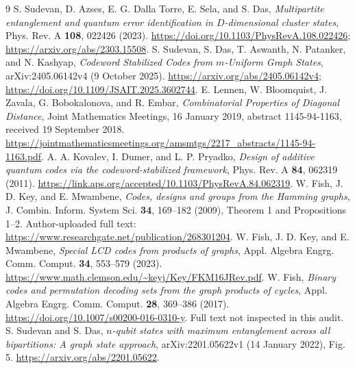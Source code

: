 \documentclass[10pt]{article}
\begin{document}
\begin{thebibliography}{9}
 S. Sudevan, D. Azses, E. G. Dalla Torre, E. Sela, and S. Das, \emph{Multipartite entanglement and quantum error identification in $D$-dimensional cluster states}, Phys. Rev. A \textbf{108}, 022426 (2023). \url{https://doi.org/10.1103/PhysRevA.108.022426}; \url{https://arxiv.org/abs/2303.15508}.
 S. Sudevan, S. Das, T. Aswanth, N. Patanker, and N. Kashyap, \emph{Codeword Stabilized Codes from $m$-Uniform Graph States}, arXiv:2405.06142v4 (9 October 2025). \url{https://arxiv.org/abs/2405.06142v4}; \url{https://doi.org/10.1109/JSAIT.2025.3602744}.
 E. Lennen, W. Bloomquist, J. Zavala, G. Bobokalonova, and R. Embar, \emph{Combinatorial Properties of Diagonal Distance}, Joint Mathematics Meetings, 16 January 2019, abstract 1145-94-1163, received 19 September 2018. \url{https://jointmathematicsmeetings.org/amsmtgs/2217_abstracts/1145-94-1163.pdf}.
 A. A. Kovalev, I. Dumer, and L. P. Pryadko, \emph{Design of additive quantum codes via the codeword-stabilized framework}, Phys. Rev. A \textbf{84}, 062319 (2011). \url{https://link.aps.org/accepted/10.1103/PhysRevA.84.062319}.
 W. Fish, J. D. Key, and E. Mwambene, \emph{Codes, designs and groups from the Hamming graphs}, J. Combin. Inform. System Sci. \textbf{34}, 169--182 (2009), Theorem 1 and Propositions 1--2. Author-uploaded full text: \url{https://www.researchgate.net/publication/268301204}.
 W. Fish, J. D. Key, and E. Mwambene, \emph{Special LCD codes from products of graphs}, Appl. Algebra Engrg. Comm. Comput. \textbf{34}, 553--579 (2023). \url{https://www.math.clemson.edu/~keyj/Key/FKM16JRev.pdf}.
 W. Fish, \emph{Binary codes and permutation decoding sets from the graph products of cycles}, Appl. Algebra Engrg. Comm. Comput. \textbf{28}, 369--386 (2017). \url{https://doi.org/10.1007/s00200-016-0310-y}. Full text not inspected in this audit.
 S. Sudevan and S. Das, \emph{$n$-qubit states with maximum entanglement across all bipartitions: A graph state approach}, arXiv:2201.05622v1 (14 January 2022), Fig. 5. \url{https://arxiv.org/abs/2201.05622}.
\end{thebibliography}
\end{document}
